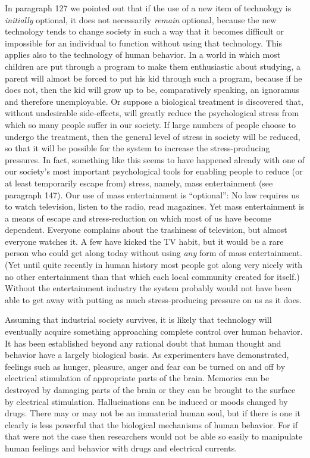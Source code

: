  In paragraph 127 we pointed out that if the use of a new item of technology is {\em initially} optional, it does not necessarily {\em remain} optional, because the new technology tends to change society in such a way that it becomes difficult or impossible for an individual to function without using that technology. This applies also to the technology of human behavior. In a world in which most children are put through a program to make them enthusiastic about studying, a parent will almost be forced to put his kid through such a program, because if he does not, then the kid will grow up to be, comparatively speaking, an ignoramus and therefore unemployable. Or suppose a biological treatment is discovered that, without undesirable side-effects, will greatly reduce the psychological stress from which so many people suffer in our society. If large numbers of people choose to undergo the treatment, then the general level of stress in society will be reduced, so that it will be possible for the system to increase the stress-producing pressures. In fact, something like this seems to have happened already with one of our society’s most important psychological tools for enabling people to reduce (or at least temporarily escape from) stress, namely, mass entertainment (see paragraph 147). Our use of mass entertainment is “optional”: No law requires us to watch television, listen to the radio, read magazines. Yet mass entertainment is a means of escape and stress-reduction on which most of us have become dependent. Everyone complains about the trashiness of television, but almost everyone watches it. A few have kicked the TV habit, but it would be a rare person who could get along today without using {\em any} form of mass entertainment. (Yet until quite recently in human history most people got along very nicely with no other entertainment than that which each local community created for itself.) Without the entertainment industry the system probably would not have been able to get away with putting as much stress-producing pressure on us as it does.

 Assuming that industrial society survives, it is likely that technology will eventually acquire something approaching complete control over human behavior. It has been established beyond any rational doubt that human thought and behavior have a largely biological basis. As experimenters have demonstrated, feelings such as hunger, pleasure, anger and fear can be turned on and off by electrical stimulation of appropriate parts of the brain. Memories can be destroyed by damaging parts of the brain or they can be brought to the surface by electrical stimulation. Hallucinations can be induced or moods changed by drugs. There may or may not be an immaterial human soul, but if there is one it clearly is less powerful that the biological mechanisms of human behavior. For if that were not the case then researchers would not be able so easily to manipulate human feelings and behavior with drugs and electrical currents.

